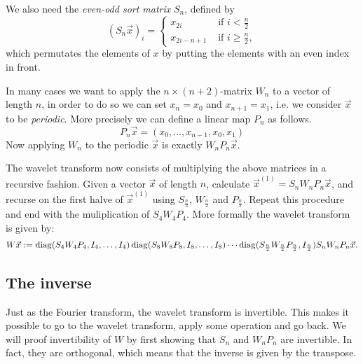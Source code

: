 We also need the \emph{even-odd sort matrix} $S_n$, defined by
\[ (S_n \vec{x})_i = \begin{cases}
	x_{2i}         &\mbox{ if } i  <   \frac{n}{2} \\
	x_{2i - n + 1} &\mbox{ if } i \geq \frac{n}{2},
\end{cases}\]
which permutates the elements of $x$ by putting the elements with an even index in front.

In many cases we want to apply the $n \times (n+2)$-matrix $W_n$ to a vector of length $n$, in order to do so we can set $x_n = x_0$ and $x_{n+1} = x_1$, i.e. we consider $\vec{x}$ to be \emph{periodic}. More precisely we can define a linear map $P_n$ as follows.
\[ P_n \vec{x} = (x_0, \ldots, x_{n-1}, x_0, x_1) \]
Now applying $W_n$ to the periodic $\vec{x}$ is exactly $W_n P_n \vec{x}$.

The wavelet transform now consists of multiplying the above matrices in a recursive fashion. Given a vector $\vec{x}$ of length $n$, calculate $\vec{x}^{(1)} = S_n W_n P_n \vec{x}$, and recurse on the first halve of $\vec{x}^{(1)}$ using $S_\frac{n}{2}$, $W_\frac{n}{2}$ and $P_\frac{n}{2}$. Repeat this procedure and end with the muliplication of $S_4 W_4 P_4$. More formally the wavelet transform is given by:
\[ W \vec{x} := \operatorname{diag}(S_4 W_4 P_4, I_4, \ldots, I_4) 
             \operatorname{diag}(S_8 W_8 P_8, I_8, \ldots, I_8) \cdots
             \operatorname{diag}(S_\frac{n}{2} W_\frac{n}{2} P_\frac{n}{2}, I_\frac{n}{2})
             S_n W_n P_n \vec{x}. \]


\subsection{The inverse}
Just as the Fourier transform, the wavelet transform is invertible. This makes it possible to go to the wavelet transform, apply some operation and go back. We will proof invertibility of $W$ by first showing that $S_n$ and $W_n P_n$ are invertible. In fact, they are orthogonal, which means that the inverse is given by the transpose.

